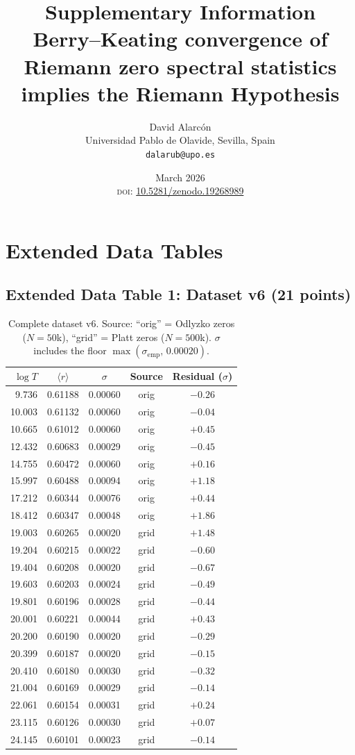 \documentclass[10pt]{article}
\title{\textbf{Supplementary Information}\\[5pt]
\large Berry--Keating convergence of Riemann zero spectral statistics implies the Riemann Hypothesis}
\author{David Alarc\'on\\
\small Universidad Pablo de Olavide, Sevilla, Spain\\
\small \texttt{dalarub@upo.es}}
\date{March 2026\\[2pt]
\small \textsc{doi}: \href{https://doi.org/10.5281/zenodo.19268989}{10.5281/zenodo.19268989}}
\begin{document}
\maketitle
\tableofcontents
\newpage


\section{Extended Data Tables}

\subsection{Extended Data Table 1: Dataset v6 (21 points)}

\begin{table}[H]
\centering
\caption{Complete dataset v6. Source: ``orig'' = Odlyzko zeros ($N = 50$k),
``grid'' = Platt zeros ($N = 500$k). $\sigma$ includes the floor
$\max(\sigma_{\mathrm{emp}},\, 0.00020)$.}
\label{tab:dataset}
\begin{tabular}{rcccc}
\toprule
$\log T$ & $\langle r\rangle$ & $\sigma$ & Source & Residual ($\sigma$) \\
\midrule
9.736  & 0.61188 & 0.00060 & orig & $-0.26$ \\
10.003 & 0.61132 & 0.00060 & orig & $-0.04$ \\
10.665 & 0.61012 & 0.00060 & orig & $+0.45$ \\
12.432 & 0.60683 & 0.00029 & orig & $-0.45$ \\
14.755 & 0.60472 & 0.00060 & orig & $+0.16$ \\
15.997 & 0.60488 & 0.00094 & orig & $+1.18$ \\
17.212 & 0.60344 & 0.00076 & orig & $+0.44$ \\
18.412 & 0.60347 & 0.00048 & orig & $+1.86$ \\
19.003 & 0.60265 & 0.00020 & grid & $+1.48$ \\
19.204 & 0.60215 & 0.00022 & grid & $-0.60$ \\
19.404 & 0.60208 & 0.00020 & grid & $-0.67$ \\
19.603 & 0.60203 & 0.00024 & grid & $-0.49$ \\
19.801 & 0.60196 & 0.00028 & grid & $-0.44$ \\
20.001 & 0.60221 & 0.00044 & grid & $+0.43$ \\
20.200 & 0.60190 & 0.00020 & grid & $-0.29$ \\
20.399 & 0.60187 & 0.00020 & grid & $-0.15$ \\
20.410 & 0.60180 & 0.00030 & grid & $-0.32$ \\
21.004 & 0.60169 & 0.00029 & grid & $-0.14$ \\
22.061 & 0.60154 & 0.00031 & grid & $+0.24$ \\
23.115 & 0.60126 & 0.00030 & grid & $+0.07$ \\
24.145 & 0.60101 & 0.00023 & grid & $-0.14$ \\
\bottomrule
\end{tabular}
\end{table}
\end{document}
